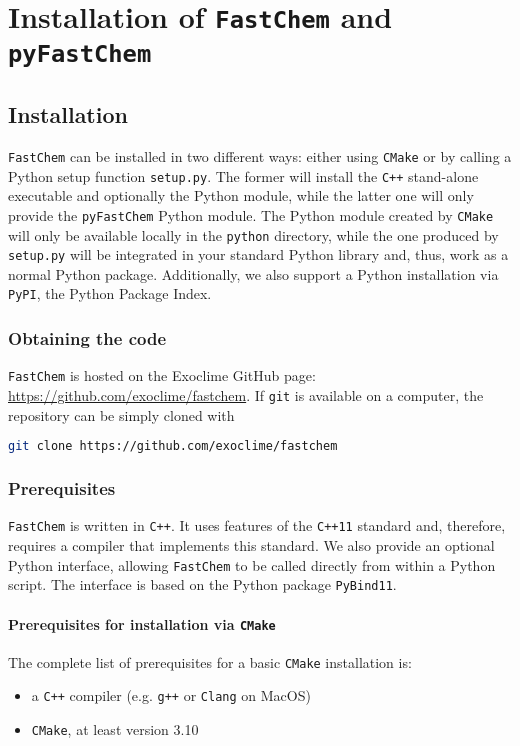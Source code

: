 \documentclass[numbers=noenddot]{aux/fcmanual}
\newcommand{\fc}{\texttt{FastChem}\xspace}
\newcommand{\pfc}{\texttt{pyFastChem}\xspace}
\newcommand{\pb}{\texttt{PyBind11}\xspace}
\newcommand{\ttt}[1]{\texttt {#1}}
\begin{document}
\part{Installation of \fc and \pfc}
\label{part:install}

\chapter{Installation}

\fc can be installed in two different ways: either using \ttt{CMake} or by calling a Python setup function \verb|setup.py|. The former will install the \ttt{C++} stand-alone executable and optionally the Python module, while the latter one will only provide the \pfc Python module. The Python module created by \ttt{CMake} will only be available locally in the \ttt{python} directory, while the one produced by \verb|setup.py| will be integrated in your standard Python library and, thus, work as a normal Python package. Additionally, we also support a Python installation via \verb|PyPI|, the Python Package Index.


\section{Obtaining the code}

\fc is hosted on the Exoclime GitHub page: \url{https://github.com/exoclime/fastchem}. If \texttt{git} is available on a computer, the repository can be simply cloned with

\begin{lstlisting}[language=bash]
git clone https://github.com/exoclime/fastchem
\end{lstlisting}

\section{Prerequisites}

\fc is written in \ttt{C++}. It uses features of the \ttt{C++11} standard and, therefore, requires a compiler that implements this standard. We also provide an optional Python interface, allowing \fc to be called directly from within a Python script. The interface is based on the Python package \pb.

\subsection{Prerequisites for installation via \ttt{CMake}}
The complete list of prerequisites for a basic \ttt{CMake} installation is:
\begin{itemize}
	\item a \ttt{C++} compiler (e.g. \ttt{g++} or \ttt{Clang} on MacOS)
	\item \ttt{CMake}, at least version 3.10
\end{itemize}
\end{document}
